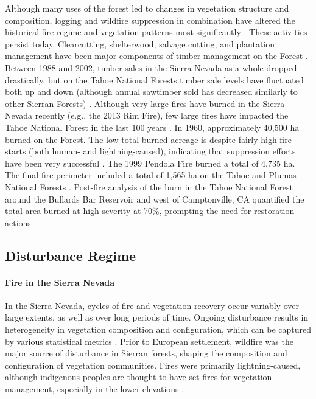 Although many uses of the forest led to changes in vegetation structure and composition, logging and wildfire suppression in combination have altered the historical fire regime and vegetation patterns most significantly \citep{Storer1963,Stephens2015,Knapp2013,Hessburg2005}. These activities persist today. Clearcutting, shelterwood, salvage cutting, and plantation management have been major components of timber management on the Forest \citep{USDAForestService2014}. Between 1988 and 2002, timber sales in the Sierra Nevada as a whole dropped drastically, but on the Tahoe National Forests timber sale levels have fluctuated both up and down (although annual sawtimber sold has decreased similarly to other Sierran Forests) \citep{USDAForestService2004}. Although very large fires have burned in the Sierra Nevada recently (e.g., the 2013 Rim Fire), few large fires have impacted the Tahoe National Forest in the last 100 years \citep{USDAForestService1990}. In 1960, approximately 40,500 ha burned on the Forest. The low total burned acreage is despite fairly high fire starts (both human- and lightning-caused), indicating that suppression efforts have been very successful \citep{USDAForestService1990,calfire2012,usgs-fire-data2012}. The 1999 Pendola Fire burned a total of 4,735 ha. The final fire perimeter included a total of 1,565 ha on the Tahoe and Plumas National Forests \citep{Shaw2009,USDOJ2009}. Post-fire analysis of the burn in the Tahoe National Forest around the Bullards Bar Reservoir and west of Camptonville, CA quantified the total area burned at high severity at 70\%, prompting the need for restoration actions \citep{USDAForestService1999}. 





\subsection{Disturbance Regime}
\paragraph*{Fire in the Sierra Nevada}
In the Sierra Nevada, cycles of fire and vegetation recovery occur variably over large extents, as well as over long periods of time. Ongoing disturbance results in heterogeneity in vegetation composition and configuration, which can be captured by various statistical metrics \citep{Monica2008}. Prior to European settlement, wildfire was the major source of disturbance in Sierran forests, shaping the composition and configuration of vegetation communities. Fires were primarily lightning-caused, although indigenous peoples are thought to have set fires for vegetation management, especially in the lower elevations \citep{Anderson1996}. 

